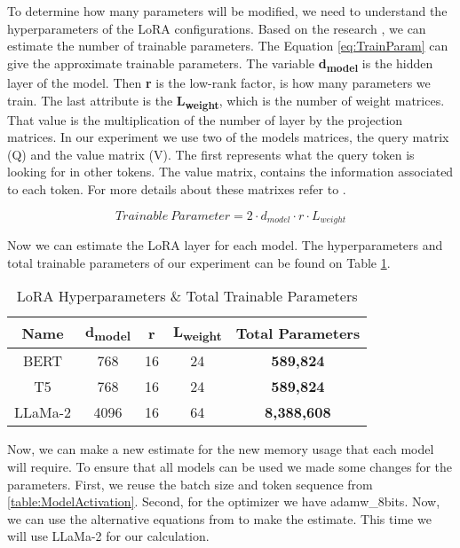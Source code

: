 To determine how many parameters will be modified, we need to understand the hyperparameters of the LoRA configurations. Based on the research \cite{hu2021loralowrankadaptationlarge},
we can estimate the number of trainable parameters. The Equation \ref{eq:TrainParam} can give the approximate trainable parameters. The variable \textbf{d\textsubscript{model}}
is the hidden layer of the model. Then \textbf{r} is the low-rank factor, is how many parameters we train. The last attribute is the \textbf{L\textsubscript{weight}}, which is the number of weight
matrices. That value is the multiplication of the number of layer by the projection matrices. In our experiment we use two of the models matrices, the query matrix (Q) and the value matrix (V).
The first represents what the query token is looking for in other tokens. The value matrix, contains the information associated to each token. For more details about these matrixes refer to \cite{vaswani2023attentionneed}.

\[ Trainable \ Parameter = 2 \cdot d_{model} \cdot r \cdot L_{weight} \label{eq:TrainParam} \tag{6} \] 

Now we can estimate the LoRA layer for each model. The hyperparameters and total trainable parameters of our experiment can be found on Table \ref{table:LoRA}.

\begin{table}[H]
	\centering
	\caption{LoRA Hyperparameters \& Total Trainable Parameters}
	\begin{tabular}{||c | c | c | c | c||} 
		\hline
		\textbf{Name} & \textbf{d\textsubscript{model}} & \textbf{r} & \textbf{L\textsubscript{weight}} & \textbf{Total Parameters} \\ [1ex] 
		\hline
		BERT & 768 & 16 & 24 & \textbf{589,824} \\ [1ex]
		\hline
		T5 & 768 & 16 & 24 & \textbf{589,824}  \\ [1ex]
		\hline
		LLaMa-2 & 4096 & 16 & 64 & \textbf{8,388,608}  \\ [1ex]
		\hline
	\end{tabular}
	\label{table:LoRA}
\end{table}

Now, we can make a new estimate for the new memory usage that each model will require. To ensure that all models can be used we made some changes for the parameters.
First, we reuse the batch size and token sequence from \ref{table:ModelActivation}. Second, for the optimizer we have adamw\_8bits. Now, we can use the alternative equations
from \cite{transformer-math-eleutherai} to make the estimate. This time we will use LLaMa-2 for our calculation.

